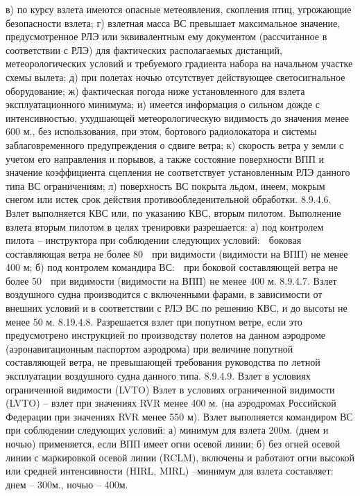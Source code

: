 в)	по курсу взлета имеются опасные метеоявления, скопления птиц, угрожающие безопасности взлета; 
г)	взлетная масса ВС превышает максимальное значение, предусмотренное РЛЭ или эквивалентным ему документом (рассчитанное в соответствии с РЛЭ) для фактических располагаемых дистанций, метеорологических условий и требуемого градиента набора на начальном участке схемы вылета; 
д)	при полетах ночью отсутствует действующее светосигнальное оборудование; 
ж)  фактическая погода ниже установленного для взлета эксплуатационного минимума; 
и)  имеется информация о сильном дожде с интенсивностью, ухудшающей метеорологическую видимость до значения менее 600 м., без использования, при этом, бортового радиолокатора и системы заблаговременного предупреждения о сдвиге ветра; 
к)  скорость ветра у земли с учетом его направления и порывов, а также состояние поверхности ВПП и значение коэффициента сцепления не соответствует установленным РЛЭ данного типа ВС ограничениям; 
л) поверхность ВС покрыта льдом, инеем, мокрым снегом или истек срок действия противообледенительной обработки. 
8.9.4.6. Взлет выполняется КВС или, по указанию КВС, вторым пилотом.
Выполнение взлета вторым пилотом в целях тренировки разрешается:
а)	под контролем пилота – инструктора при соблюдении следующих условий:
	боковая составляющая ветра не более 80%
	при видимости (видимости на ВПП) не менее 400 м;
б)	под контролем командира ВС:
	при боковой составляющей ветра не более 50%
	при видимости (видимости на ВПП) не менее 400 м.
8.9.4.7. Взлет воздушного судна производится с включенными фарами, в зависимости от внешних условий и в соответствии с РЛЭ ВС по решению КВС, и до высоты не менее 50 м. 
8.19.4.8. Разрешается взлет при попутном ветре, если это предусмотрено инструкцией по производству полетов на данном аэродроме (аэронавигационным паспортом аэродрома) при величине попутной составляющей ветра, не превышающей требования руководства по летной эксплуатации воздушного судна данного типа.
8.9.4.9.	Взлет в условиях ограниченной видимости (LVTO)
Взлет в условиях ограниченной видимости (LVTO) – взлет при значениях RVR менее 400 м. (на аэродромах Российской Федерации при значениях RVR менее 550 м).
Взлет выполняется командиром ВС при соблюдении следующих условий:
а)	минимум для взлета 200м. (днем и ночью) применяется, если ВПП имеет огни осевой линии;
б)	без огней осевой линии с маркировкой осевой линии (RCLM), включены и работают огни высокой или средней интенсивности (HIRL, MIRL) –минимум для взлета составляет: днем – 300м., ночью – 400м. 
